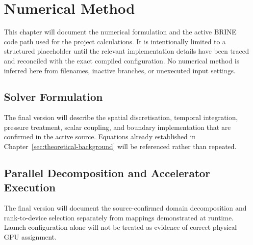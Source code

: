 \chapter{Numerical Method}
\label{ch:numerical-method}

This chapter will document the numerical formulation and the active BRINE code
path used for the project calculations. It is intentionally limited to a
structured placeholder until the relevant implementation details have been
traced and reconciled with the exact compiled configuration. No numerical
method is inferred here from filenames, inactive branches, or unexecuted input
settings.

\section{Solver Formulation}

The final version will describe the spatial discretisation, temporal
integration, pressure treatment, scalar coupling, and boundary implementation
that are confirmed in the active source. Equations already established in
Chapter~\ref{sec:theoretical-background} will be referenced rather than
repeated.

\section{Parallel Decomposition and Accelerator Execution}

The final version will document the source-confirmed domain decomposition and
rank-to-device selection separately from mappings demonstrated at runtime.
Launch configuration alone will not be treated as evidence of correct physical
GPU assignment.
